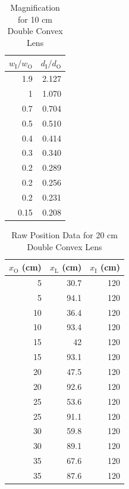 \begin{table}[ht]
    \centering
    \begin{tabular}{|r|r|}
        \hline
        $w_{\text{I}} / w_{\text{O}}$ & $d_{\text{I}} / d_{\text{O}}$ \\
        \hline
        1.9 & 2.127 \\
        1 & 1.070 \\
        0.7 & 0.704 \\
        0.5 & 0.510 \\
        0.4 & 0.414 \\
        0.3 & 0.340 \\
        0.2 & 0.289 \\
        0.2 & 0.256 \\
        0.2 & 0.231 \\
        0.15 & 0.208 \\
        \hline
    \end{tabular}
    \caption{Magnification for 10 cm Double Convex Lens}
    \label{table.08.magnification.10cm}
\end{table}
%
\begin{table}[ht!]
    \centering
    \begin{tabular}{|r|r|r|}
        \hline
        $x_{\text{O}}$ (cm) & $x_{\text{L}}$ (cm) & $x_{\text{I}}$ (cm) \\
        \hline
        5 & 30.7 & 120 \\
        5 & 94.1 & 120 \\
        10 & 36.4 & 120 \\
        10 & 93.4 & 120 \\
        15 & 42 & 120 \\
        15 & 93.1 & 120 \\
        20 & 47.5 & 120 \\
        20 & 92.6 & 120 \\
        25 & 53.6 & 120 \\
        25 & 91.1 & 120 \\
        30 & 59.8 & 120 \\
        30 & 89.1 & 120 \\
        35 & 67.6 & 120 \\
        35 & 87.6 & 120 \\
        \hline
        \end{tabular}
    \caption{Raw Position Data for 20 cm Double Convex Lens}
    \label{table.08.position.20cm}
\end{table}
%
